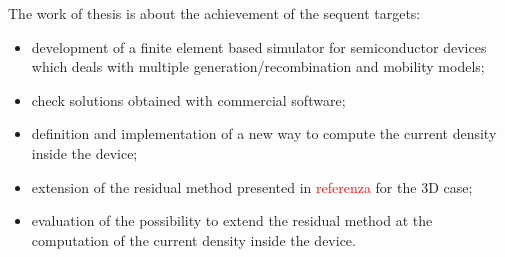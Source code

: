 The work of thesis is about the achievement of the sequent targets:
\begin{itemize}
\item development of a finite element based simulator for semiconductor devices which deals with multiple generation/recombination and mobility models;
\item check solutions obtained with commercial software;
\item definition and implementation of a new way to compute the current density inside the device;
\item extension of the residual method presented in \textcolor{red}{referenza} for the 3D case;
\item evaluation of the possibility to extend the residual method at the computation of the current density inside the device.
\end{itemize}

